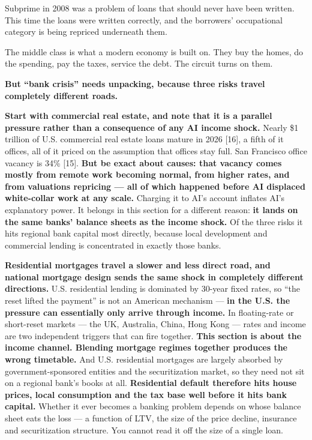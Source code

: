 \documentclass[11pt,a4paper]{article}
\begin{document}
Subprime in 2008 was a problem of loans that should never have been written. This time the loans were written correctly, and the borrowers' occupational category is being repriced underneath them.

The middle class is what a modern economy is built on. They buy the homes, do the spending, pay the taxes, service the debt. The circuit turns on them.

\textbf{But ``bank crisis'' needs unpacking, because three risks travel completely different roads.}

\textbf{Start with commercial real estate, and note that it is a parallel pressure rather than a consequence of any AI income shock.} Nearly \$1 trillion of U.S. commercial real estate loans mature in 2026 [16], a fifth of it offices, all of it priced on the assumption that offices stay full. San Francisco office vacancy is 34\% [15]. \textbf{But be exact about causes: that vacancy comes mostly from remote work becoming normal, from higher rates, and from valuations repricing --- all of which happened before AI displaced white-collar work at any scale.} Charging it to AI's account inflates AI's explanatory power. It belongs in this section for a different reason: \textbf{it lands on the same banks' balance sheets as the income shock.} Of the three risks it hits regional bank capital most directly, because local development and commercial lending is concentrated in exactly those banks.

\textbf{Residential mortgages travel a slower and less direct road, and national mortgage design sends the same shock in completely different directions.} U.S. residential lending is dominated by 30-year fixed rates, so ``the reset lifted the payment'' is not an American mechanism --- \textbf{in the U.S. the pressure can essentially only arrive through income.} In floating-rate or short-reset markets --- the UK, Australia, China, Hong Kong --- rates and income are two independent triggers that can fire together. \textbf{This section is about the income channel. Blending mortgage regimes together produces the wrong timetable.} And U.S. residential mortgages are largely absorbed by government-sponsored entities and the securitization market, so they need not sit on a regional bank's books at all. \textbf{Residential default therefore hits house prices, local consumption and the tax base well before it hits bank capital.} Whether it ever becomes a banking problem depends on whose balance sheet eats the loss --- a function of LTV, the size of the price decline, insurance and securitization structure. You cannot read it off the size of a single loan.
\end{document}
